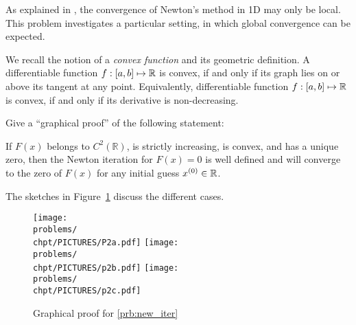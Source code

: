 
\begin{problem} \label{prb:new_iter}
  As explained in , the convergence of Newton's method in 1D may only be local. This problem
  investigates a particular setting, in which global convergence can be expected. 

  We recall the notion of a \emph{convex function} and its geometric definition.  A
  differentiable function $f:[a,b]\mapsto \mathbb{R}$ is convex, if and only if its graph
  lies on or above its tangent at any point. Equivalently, differentiable function
  $f:[a,b]\mapsto \mathbb{R}$ is convex, if and only if its derivative is non-decreasing. 

  Give a ``graphical proof'' of the following statement:

  If $F(x)$ belongs to $C^{2}(\mathbb{R})$, is strictly increasing, is convex, and
  has a unique zero, then the Newton iteration  for $F(x)=0$ is
  well defined and will converge to the zero of $F(x)$ for any initial guess
  $x^{(0)}\in\mathbb{R}$.
  
\cprotEnv \begin{solution}
    The sketches in Figure~\ref{fig:graph_proof_newt} discuss the different cases.
\begin{figure}[h!]
\begin{centering}
\texttt{[image: \\problems/\\chpt/PICTURES/P2a.pdf]}
\texttt{[image: \\problems/\\chpt/PICTURES/p2b.pdf]}
\texttt{[image: \\problems/\\chpt/PICTURES/p2c.pdf]}
\caption{Graphical proof for \ref{prb:new_iter}}
\label{fig:graph_proof_newt}
\end{centering}
\end{figure}
\end{solution}

\end{problem}